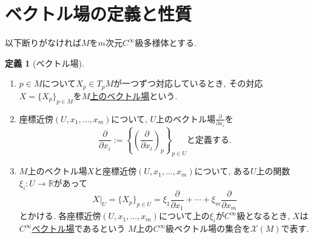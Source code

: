 \documentclass[dvipdfmx,a4paper,11pt]{article}
\newcommand{\R}{\mathbb{R}}
\theoremstyle{definition}
\newtheorem{dfn}[thm]{定義}
\newcommand{\pdrv}[2]{\frac{\partial #1}{\partial #2}}
\begin{document}

\section{ベクトル場の定義と性質}
以下断りがなければ$M$を$m$次元$C^\infty$級多様体とする.
\begin{tcolorbox}[
    colback = white,
    colframe = green!35!black,
    fonttitle = \bfseries,
    breakable = true]
    \begin{dfn}[ベクトル場]
 \text{}
    \begin{enumerate}
    \setlength{\parskip}{0cm}
  \setlength{\itemsep}{2pt} 
    \item $p \in M$について$X_{p} \in T_{p}M$が一つずつ対応しているとき, その対応$X = \{ X_p\}_{p \in M}$を\underline{$M$上のベクトル場}という.
    \item 座標近傍$(U, x_1, \ldots, x_m)$について, $U$上のベクトル場$\pdrv{}{x_i}$を
    $$\pdrv{}{x_i} := \left\{ \left( \pdrv{}{x_i} \right)_p \right\}_{p \in U} \text{と定義する.}$$
    \item $M$上のベクトル場$X$と座標近傍$(U, x_1, \ldots, x_m)$について, ある$U$上の関数$\xi_i : U \rightarrow \R$があって
    $$
   X|_{U}= \{ X_p\}_{p \in U} = \xi_1 \pdrv{}{x_1} + \cdots +\xi_m \pdrv{}{x_m}
    $$
    とかける. %
    各座標近傍$(U, x_1, \ldots, x_m)$について上の$\xi_i $が$C^{\infty}$級となるとき, $X$は\underline{$C^{\infty}$ベクトル場}であるという
    $M$上の$C^{\infty}$級ベクトル場の集合を$\mathscr{X}(M)$で表す. 
    \end{enumerate}
       \end{dfn}
    \end{tcolorbox}
    
 
 
\end{document}
